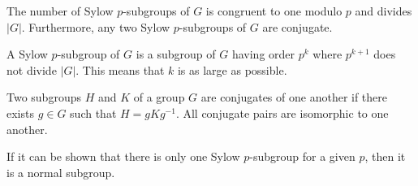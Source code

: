 \documentclass{article}
\begin{document}
The number of Sylow $p$-subgroups of $G$ is congruent
to one modulo $p$ and divides $|G|$.  Furthermore,
any two Sylow $p$-subgroups of $G$ are conjugate.

A Sylow $p$-subgroup of $G$ is a subgroup of $G$
having order $p^k$ where $p^{k+1}$ does not divide $|G|$.
This means that $k$ is as large as possible.

Two subgroups $H$ and $K$ of a group $G$ are conjugates
of one another if there exists $g\in G$ such that
$H=gKg^{-1}$.
All conjugate pairs are isomorphic to one another.

If it can be shown that there is only one Sylow $p$-subgroup
for a given $p$, then it is a normal subgroup.
\end{document}
